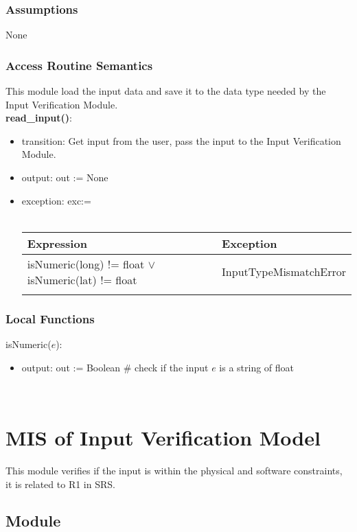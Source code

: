\documentclass[12pt, titlepage]{article}
\begin{document}
\subsubsection{Assumptions}
None

\subsubsection{Access Routine Semantics}
This module load the input data and save it to the data type needed by the Input Verification Module.\\
\noindent \textbf{read\_input()}:
\begin{itemize}
\item transition: Get input from the user, pass the input to the Input Verification Module.
\item output: out := None
\item exception: exc:= \\ \\ 
 \begin{tabular}{p{10cm} p{3.5cm} }
 \hline
 \textbf{Expression} & \textbf{Exception}  \\

  \hline
     isNumeric(long) != float $\lor$ isNumeric(lat) != float   & InputTypeMismatchError \\ \\

  \hline
 \end{tabular}
\end{itemize}


\subsubsection{Local Functions}
\noindent isNumeric($e$):
\begin{itemize}
\item output: out := Boolean \# check if the input $e$ is a string of float 
\end{itemize}
  
  
~\newpage

\section{MIS of Input Verification Model} \label{inputVerificationModule} 
This module verifies if the input is within the physical and software constraints, it is related to R1 in SRS.
\subsection{Module}
\end{document}
